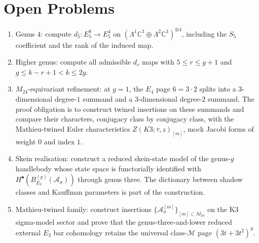 \documentclass[11pt]{article}
\theoremstyle{plain}
\theoremstyle{definition}
\theoremstyle{remark}
\newcommand{\C}{\mathbb{C}}
\newcommand{\cA}{\mathcal{A}}
\begin{document}
\section{Open Problems}
\label{sec:open}

\begin{enumerate}
 \item Genus $4$: compute
   $d_5:E_5^8\to E_5^4$ on
   $(\Lambda^1\C^3\oplus\Lambda^2\C^3)^{\otimes4}$, including the
   $S_5$ coefficient and the rank of the induced map.
 \item Higher genus: compute all admissible $d_r$ maps with
   $5\leq r\leq g+1$ and $g\leq k-r+1<k\leq 2g$.
 \item $M_{24}$-equivariant refinement: at $g=1$, the $E_4$ page $6=3\cdot 2$
   splits into a $3$-dimensional degree-$1$ summand and a $3$-dimensional
   degree-$2$ summand. The proof obligation is to construct twined
   insertions on these summands and compare their characters, conjugacy
   class by conjugacy class, with the Mathieu-twined Euler characteristics
   $Z(K3;\tau,z)_{[m]}$, mock Jacobi forms of weight $0$ and index $1$.
 \item Skein realisation: construct a reduced skein-state model of the
   genus-$g$ handlebody whose state space is functorially identified with
   $H^\bullet(B_{E_3}^{(g)}(\cA_\sigma))$ through genus three. The
   dictionary between shadow classes and Kauffman parameters is part of the
   construction.
 \item Mathieu-twined family: construct insertions
   $\{\cA_\sigma^{[m]}\}_{[m]\subset M_{24}}$ on the K3 sigma-model sector
   and prove that the genus-three-and-lower reduced external $E_3$ bar
   cohomology retains the universal class-$\mathcal{M}$ page
   $(3t+3t^2)^g$.
\end{enumerate}
\end{document}
